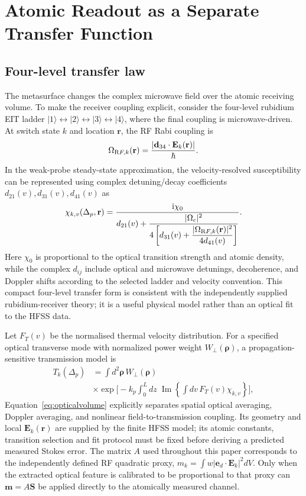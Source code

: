 \documentclass{ieeeaccess}
\newcommand{\Svec}{\boldsymbol{S}}
\newcommand{\mvec}{\boldsymbol{m}}
\begin{document}
\section{Atomic Readout as a Separate Transfer Function}\label{app:atom}
\subsection{Four-level transfer law}
The metasurface changes the complex microwave field over the atomic receiving volume. To make the receiver coupling explicit, consider the four-level rubidium EIT ladder $|1\rangle\leftrightarrow|2\rangle\leftrightarrow|3\rangle\leftrightarrow|4\rangle$, where the final coupling is microwave-driven. At switch state $k$ and location $\mathbf r$, the RF Rabi coupling is
\begin{equation}
\Omega_{\rm RF,k}(\mathbf r)=\frac{|\mathbf d_{34}\cdot\mathbf E_k(\mathbf r)|}{\hbar}.
\label{eq:opticalbridge}
\end{equation}
In the weak-probe steady-state approximation, the velocity-resolved susceptibility can be represented using complex detuning/decay coefficients $d_{21}(v),d_{31}(v),d_{41}(v)$ as
\begin{equation}
\chi_{k,v}(\Delta_p,\mathbf r)=
\frac{\mathrm i\chi_0}{d_{21}(v)+\dfrac{|\Omega_c|^2}{4\left[d_{31}(v)+\dfrac{|\Omega_{\rm RF,k}(\mathbf r)|^2}{4d_{41}(v)}\right]}}.
\label{eq:fourlevel}
\end{equation}
Here $\chi_0$ is proportional to the optical transition strength and atomic density, while the complex $d_{ij}$ include optical and microwave detunings, decoherence, and Doppler shifts according to the selected ladder and velocity convention. This compact four-level transfer form is consistent with the independently supplied rubidium-receiver theory\cite{Somaweera2025Review}; it is a useful physical model rather than an optical fit to the HFSS data.

Let $F_T(v)$ be the normalised thermal velocity distribution. For a specified optical transverse mode with normalized power weight $W_\perp(\boldsymbol\rho)$, a propagation-sensitive transmission model is
\begin{equation}
\begin{split}
T_k(\Delta_p)&=\int d^2\boldsymbol\rho\,W_\perp(\boldsymbol\rho)\\
&\times\exp\!\Bigg[-k_p\int_0^L dz\;\operatorname{Im}
\left\{\int dv\,F_T(v)\chi_{k,v}\right\}\Bigg],
\end{split}
\label{eq:opticalvolume}
\end{equation}
Equation~\eqref{eq:opticalvolume} explicitly separates spatial optical averaging, Doppler averaging, and nonlinear field-to-transmission coupling. Its geometry and local $\mathbf E_k(\mathbf r)$ are supplied by the finite HFSS model; its atomic constants, transition selection and fit protocol must be fixed before deriving a predicted measured Stokes error. The matrix $A$ used throughout this paper corresponds to the independently defined RF quadratic proxy, $m_k=\int w|\mathbf e_d\cdot\mathbf E_k|^2dV$. Only when the extracted optical feature is calibrated to be proportional to that proxy can $\mvec=A\Svec$ be applied directly to the atomically measured channel.
\end{document}
